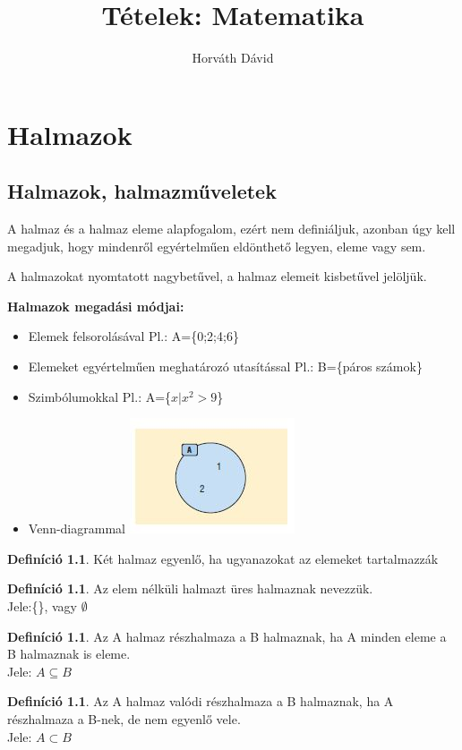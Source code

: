 \documentclass[twoside,12pt]{report}
\title{Tételek: Matematika}
\author{Horváth Dávid}
\theoremstyle{definition}
\newtheorem{definition}[theorem]{Definíció}
\begin{document}
\pagestyle{fancy}
\maketitle
\tableofcontents
\pagebreak
\chapter{Halmazok}
\section{Halmazok, halmazműveletek}
	A halmaz és a halmaz eleme alapfogalom, ezért nem definiáljuk, azonban úgy kell megadjuk, hogy mindenről egyértelműen eldönthető legyen, eleme vagy sem.
	
	A halmazokat nyomtatott nagybetűvel, a halmaz elemeit kisbetűvel jelöljük.
	
	\vspace{1 em}
	
	\noindent
	\textbf{Halmazok megadási módjai:}
	\begin{itemize}
		\item Elemek felsorolásával
			\subitem Pl.: A=\{0;2;4;6\}
		\item Elemeket egyértelműen meghatározó utasítással
			\subitem Pl.: B=\{páros számok\}
		\item Szimbólumokkal
			\subitem Pl.: A=\{$x|x^2>9$\}
		\item Venn-diagrammal
			\subitem \includegraphics[]{Venn}
	\end{itemize}

	\begin{definition}
		Két halmaz egyenlő, ha ugyanazokat az elemeket tartalmazzák
	\end{definition}
	\begin{definition}
		Az elem nélküli halmazt üres halmaznak nevezzük.\\
		Jele:\{\}, vagy $\emptyset$
	\end{definition}
	\begin{definition}
		Az A halmaz részhalmaza a B halmaznak, ha A minden eleme a B halmaznak is eleme.\\
		Jele: $A\subseteq B$
	\end{definition}
	\begin{definition}
		Az A halmaz valódi részhalmaza a B halmaznak, ha A részhalmaza a B-nek, de nem
		egyenlő vele.\\
		Jele: $A\subset B$
	\end{definition}
	
\end{document}
